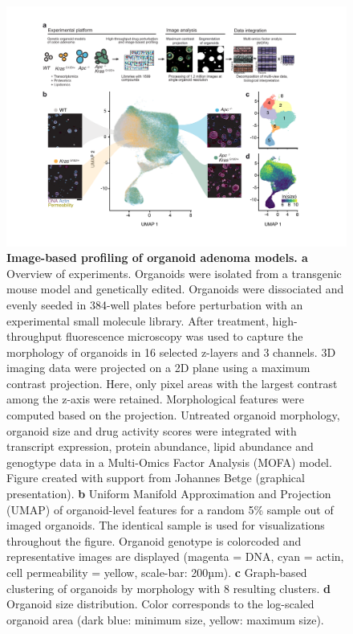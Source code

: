 \begin{flushleft}
\begin{figure}[h!]
\centering
\includegraphics[width=\textwidth,
                height=\textheight,
                keepaspectratio]{figures/adenomaprofiling/pdf/fig_1_2.pdf}
\caption{\textbf{Image-based profiling of organoid adenoma models. a} Overview of experiments. Organoids were isolated from a transgenic mouse model and genetically edited. Organoids were dissociated and evenly seeded in 384-well plates before perturbation with an experimental small molecule library. After treatment, high-throughput fluorescence microscopy was used to capture the morphology of organoids in 16 selected z-layers and 3 channels. 3D imaging data were projected on a 2D plane using a maximum contrast projection. Here, only pixel areas with the largest contrast among the z-axis were retained. Morphological features were computed based on the projection. Untreated organoid morphology, organoid size and drug activity scores were integrated with transcript expression, protein abundance, lipid abundance and genogtype data in a Multi-Omics Factor Analysis (MOFA) model. Figure created with support from Johannes Betge (graphical presentation). 
\textbf{b} Uniform Manifold Approximation and Projection (UMAP) of organoid-level features for a random 5\% sample out of imaged organoids. The identical sample is used for visualizations throughout the figure. Organoid genotype is colorcoded and representative images are displayed (magenta = DNA, cyan = actin, cell permeability = yellow, scale-bar: 200µm). \textbf{c} Graph-based clustering of organoids by morphology with 8 resulting clusters. \textbf{d} Organoid size distribution. Color corresponds to the log-scaled organoid area (dark blue: minimum size, yellow: maximum size).}
\label{fig_120}
\end{figure}
\bigbreak


\end{flushleft}
